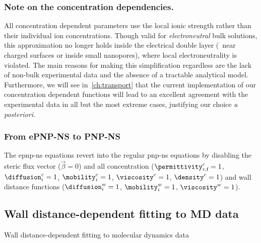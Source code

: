 \subsubsection{Note on the concentration dependencies.}
%

All concentration dependent parameters use the local ionic strength rather than their individual ion
concentrations. Though valid for \emph{electroneutral} bulk solutions, this approximation no longer holds
inside the electrical double layer (\ie~near charged surfaces or inside small nanopores), where local
electroneutrality is violated. The main reasons for making this simplification regardless are the lack of
non-bulk experimental data and the absence of a tractable analytical model. Furthermore, we will see
in~\cref{ch:transport} that the current implementation of our concentration dependent functions will lead to
an excellent agreement with the experimental data in all but the most extreme cases, justifying our choice
\textit{a posteriori}. 

\subsubsection{From {ePNP-NS} to {PNP-NS}}
%

The \gls{epnp-ns} equations revert into the regular \gls{pnp-ns} equations by disabling the steric flux vector
($\vec{\beta}=0$) and all concentration ($\permittivity_{r,\text{f}}^c=1$, $\diffusion_{i}^c=1$,
$\mobility_{i}^c=1$, $\viscosity^c=1$, $\density^c=1$) and wall distance functions ($\diffusion_{i}^w=1$,
$\mobility_{i}^w=1$, $\viscosity^w=1$).

%
\clearpage
%

%
\subsection{Wall distance-dependent fitting to {MD} data}%
           {Wall distance-dependent fitting to molecular dynamics data}
%

